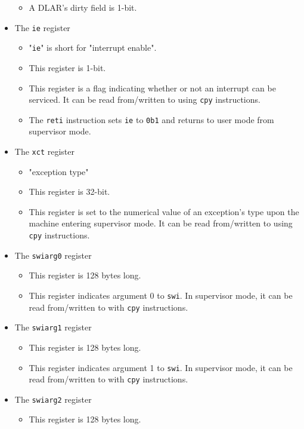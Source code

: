 \documentclass{article}
\begin{document}
\begin{itemize}
\begin{itemize}
		\item A DLAR's dirty field is 1-bit.
		\end{itemize}
	\item The \texttt{ie} register
		\begin{itemize}
		\item "\texttt{ie}" is short for "interrupt enable".
		\item This register is 1-bit.
		\item This register is a flag indicating whether or not an
			interrupt can be serviced. It can be read from/written to using
			\texttt{cpy} instructions.
		\item The \texttt{reti} instruction sets \texttt{ie} to
			\texttt{0b1} and returns to user mode from supervisor mode.
		\end{itemize}
	\item The \texttt{xct} register
		\begin{itemize}
		\item "exception type"
		\item This register is 32-bit.
		\item This register is set to the numerical value of an exception's
			type upon the machine entering supervisor mode. It can be read
			from/written to using \texttt{cpy} instructions.
		\end{itemize}
	\item The \texttt{swiarg0} register
		\begin{itemize}
		\item This register is 128 bytes long.
		\item This register indicates argument 0 to \texttt{swi}. In
			supervisor mode, it can be read from/written to with
			\texttt{cpy} instructions.
		\end{itemize}
	\item The \texttt{swiarg1} register
		\begin{itemize}
		\item This register is 128 bytes long.
		\item This register indicates argument 1 to \texttt{swi}. In
			supervisor mode, it can be read from/written to with
			\texttt{cpy} instructions.
		\end{itemize}
	\item The \texttt{swiarg2} register
		\begin{itemize}
		\item This register is 128 bytes long.

\end{itemize}
\end{itemize}
\end{document}
